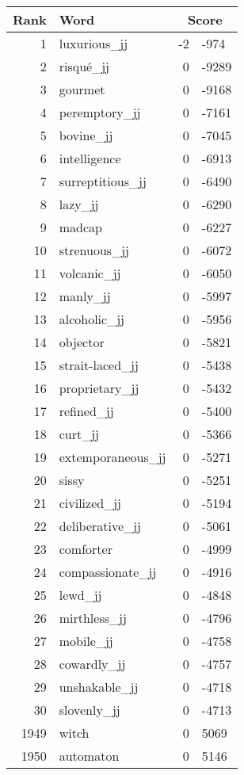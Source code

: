 \begin{longtable}[!htbp]{| rlr@{.}l |}
    \hline
    \textbf{Rank} & \textbf{Word} & \multicolumn{2}{c|}{\textbf{Score}} \\
    \hline
    \endhead
    1 & luxurious\_jj & -2 & -974 \\
    2 & risqué\_jj & 0 & -9289 \\
    3 & gourmet & 0 & -9168 \\
    4 & peremptory\_jj & 0 & -7161 \\
    5 & bovine\_jj & 0 & -7045 \\
    6 & intelligence & 0 & -6913 \\
    7 & surreptitious\_jj & 0 & -6490 \\
    8 & lazy\_jj & 0 & -6290 \\
    9 & madcap & 0 & -6227 \\
    10 & strenuous\_jj & 0 & -6072 \\
    11 & volcanic\_jj & 0 & -6050 \\
    12 & manly\_jj & 0 & -5997 \\
    13 & alcoholic\_jj & 0 & -5956 \\
    14 & objector & 0 & -5821 \\
    15 & strait-laced\_jj & 0 & -5438 \\
    16 & proprietary\_jj & 0 & -5432 \\
    17 & refined\_jj & 0 & -5400 \\
    18 & curt\_jj & 0 & -5366 \\
    19 & extemporaneous\_jj & 0 & -5271 \\
    20 & sissy & 0 & -5251 \\
    21 & civilized\_jj & 0 & -5194 \\
    22 & deliberative\_jj & 0 & -5061 \\
    23 & comforter & 0 & -4999 \\
    24 & compassionate\_jj & 0 & -4916 \\
    25 & lewd\_jj & 0 & -4848 \\
    26 & mirthless\_jj & 0 & -4796 \\
    27 & mobile\_jj & 0 & -4758 \\
    28 & cowardly\_jj & 0 & -4757 \\
    29 & unshakable\_jj & 0 & -4718 \\
    30 & slovenly\_jj & 0 & -4713 \\
    1949 & witch & 0 & 5069 \\
    1950 & automaton & 0 & 5146 \\

\end{longtable}
